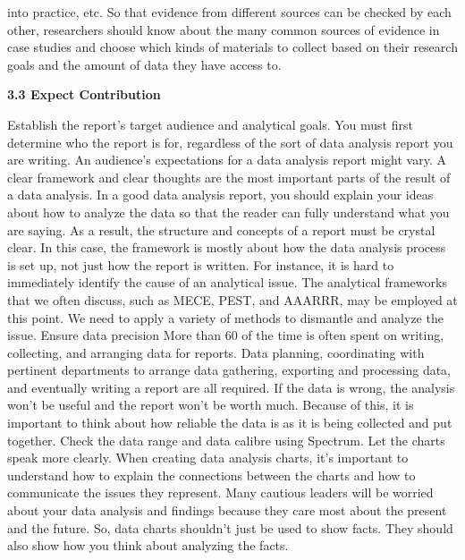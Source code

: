\documentclass[journal]{IEEEtran}
\begin{document}
into practice, etc. So that evidence from different sources can be checked by each other, researchers should know about the many common sources of evidence in case studies and choose which kinds of materials to collect based on their research goals and the amount of data they have access to.


\textbf{3.3 Expect Contribution}
\par Establish the report's target audience and analytical goals. You must first determine who the report is for, regardless of the sort of data analysis report you are writing. An audience's expectations for a data analysis report might vary. A clear framework and clear thoughts are the most important parts of the result of a data analysis. In a good data analysis report, you should explain your ideas about how to analyze the data so that the reader can fully understand what you are saying. As a result, the structure and concepts of a report must be crystal clear. In this case, the framework is mostly about how the data analysis process is set up, not just how the report is written. For instance, it is hard to immediately identify the cause of an analytical issue. The analytical frameworks that we often discuss, such as MECE, PEST, and AAARRR, may be employed at this point. We need to apply a variety of methods to dismantle and analyze the issue. Ensure data precision
More than 60 of the time is often spent on writing, collecting, and arranging data for reports. Data planning, coordinating with pertinent departments to arrange data gathering, exporting and processing data, and eventually writing a report are all required. If the data is wrong, the analysis won't be useful and the report won't be worth much. Because of this, it is important to think about how reliable the data is as it is being collected and put together. Check the data range and data calibre using Spectrum. Let the charts speak more clearly. When creating data analysis charts, it's important to understand how to explain the connections between the charts and how to communicate the issues they represent. Many cautious leaders will be worried about your data analysis and findings because they care most about the present and the future. So, data charts shouldn't just be used to show facts. They should also show how you think about analyzing the facts.
\end{document}
